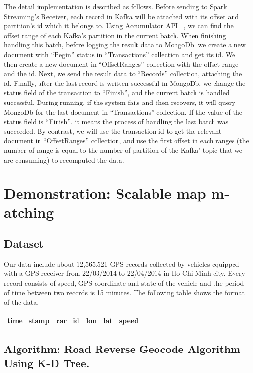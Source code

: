 \documentclass{acm_proc_article-sp}
\begin{document}
The detail implementation is described as follows. Before sending to Spark Streaming's Receiver, each record in Kafka will be attached with its offset and partition's id which it belongs to. Using Accumulator API ~\cite{accumulatorapi}, we can find the offset range of each Kafka's partition in the current batch. When finishing handling this batch, before logging the result data to MongoDb, we create a new document with ``Begin'' status in ``Transactions'' collection and get its id. We then create a new document in ``OffsetRanges'' collection with the offset range and the id. Next, we send the result data to ``Records'' collection, attaching the id. Finally, after the last record is written successful in MongoDb, we change the status field of the transaction to ``Finish'', and the current batch is handled successful. During running, if the system fails and then recovers, it will query MongoDb for the last document in ``Transactions'' collection.  If the value of the status field is ``Finish'', it means the process of handling the last batch was succeeded. By contrast, we will use the transaction id to get the relevant document in ``OffsetRanges'' collection, and use the first offset in each ranges (the number of range is equal to the number of partition of the Kafka' topic that we are consuming) to recomputed the data. 

\section{Demonstration: Scalable map m-atching}
\subsection{Dataset}
Our data include about 12,565,521 GPS records collected by vehicles equipped with a GPS receiver from 22/03/2014 to 22/04/2014 in Ho Chi Minh city. Every record consists of speed, GPS coordinate and state of the vehicle and the period of time between two records is 15 minutes. The following table shows the format of the data.

\begin{table}[h]
\centering
\begin{tabular}{|c|c|c|c|c|}
\hline
\textbf{time\_stamp} & \textbf{car\_id} & \textbf{lon}   & \textbf{lat} & \textbf{speed} \\ \hline
\end{tabular}
\end{table}

\subsection{Algorithm: Road Reverse Geocode Algorithm Using K-D Tree.}	
	
\end{document}
